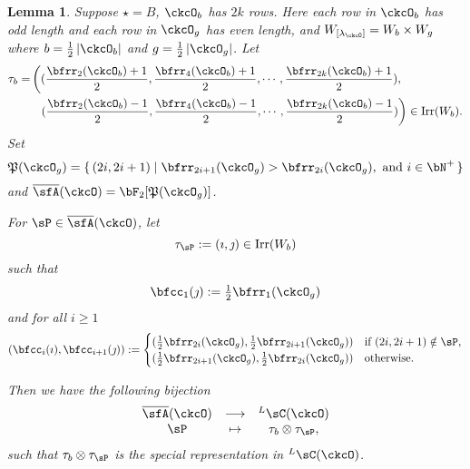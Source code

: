 \documentclass[12pt,a4paper]{amsart}
\def\abs#1{\left|{#1}\right|}
\newcommand{\CQ}{{\mathcal {Q}}}
\numberwithin{equation}{section}
\newtheorem{lem}[thm]{Lemma}
\theoremstyle{remark}
\def\half{{\tfrac{1}{2}}}
\def\Irr{\mathrm{Irr}}
\def\WLamck{W_{[\lambda_{\ckcO}]}}
\def\LC{{}^L\sC}
\def\CQ{\overline{\sfA}}%
\def\CPP{\mathfrak{P}}
\begin{document}
\begin{lem}
  Suppose $\star = B$, $\ckcO_{b}$ has $2k$ rows. Here each row in $\ckcO_{b}$ has
  odd length and each row in $\ckcO_{g}$ has even length, and
  $\WLamck = W_{b}\times W_{g}$ where $b=\half \abs{\ckcO_{b}}$ and
  $g = \half\abs{\ckcO_{g}}$.
  Let
  \[
    \begin{split}
      \tau_{b} =  & \left( (\frac{\bfrr_{2}(\ckcO_{b})+1}{2}, \frac{\bfrr_{4}(\ckcO_{b})+1}{2}, \cdots, \frac{\bfrr_{2k}(\ckcO_{b})+1}{2}),\right.\\
        &\ \ \left. (\frac{\bfrr_{2}(\ckcO_{b})-1}{2}, \frac{\bfrr_{4}(\ckcO_{b})-1}{2}, \cdots, \frac{\bfrr_{2k}(\ckcO_{b})-1}{2})\right) \in \Irr(W_{b}).
    \end{split}
  \]
  Set
  \[
    \CPP(\ckcO_{g}) = \set{(2i,2i+1)| \bfrr_{2i+1}(\ckcO_{g})> \bfrr_{2i}(\ckcO_{g}), \text{
        and } i\in \bN^{+}}
  \]
  and $\CQ(\ckcO)= \bF_{2}[\CPP(\ckcO_{g})]$.

  For $\sP \in \CQ(\ckcO)$, let
  \[
    \tau_{\sP} := (\imath,\jmath) \in \Irr(W_{b})
  \]
  such that
  \[
    \bfcc_{1}(\jmath)  := \half\bfrr_{1}(\ckcO_{g})
  \]
  and for all $i\geq 1$
  \[
  (\bfcc_{i}(\imath), \bfcc_{i+1}(\jmath)):=
  \begin{cases}
    (\half \bfrr_{2i}(\ckcO_{g}), \half \bfrr_{2i+1}(\ckcO_{g}))
    & \text{if } (2i,2i+1)\notin \sP,\\
    (\half \bfrr_{2i+1}(\ckcO_{g}),\half \bfrr_{2i}(\ckcO_{g})) & \text{otherwise.}
  \end{cases}
  \]

  Then we have the following bijection
  \[
    \begin{array}{ccc}
      \CQ(\ckcO) &\longrightarrow & \LC(\ckcO)\\
      \sP & \mapsto & \tau_{b}\otimes \tau_{\sP},
    \end{array}
  \]
  such that $\tau_{b}\otimes \tau_{\sP}$ is the special representation in
  $\LC(\ckcO)$.
\end{lem}
\end{document}
